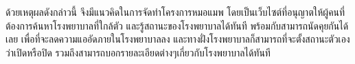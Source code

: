 \documentclass[12pt,a4paper]{report}
\begin{document}
ด้วยเหตุผลดังกล่าวนี้ จึงมีแนวคิดในการจัดทำโครงการหมอแมพ โดยเป็นเว็บไซต์ที่อนุญาตให้ผู้คนที่ต้องการค้นหาโรงพยาบาลที่ใกล้ตัว และรู้สถานะของโรงพยาบาลได้ทันที พร้อมกับสามารถนัดคุยกันได้เลย เพื่อที่จะลดความแออัดภายในโรงพยาบาลลง
และทางฝั่งโรงพยาบาลก็สามารถที่จะตั้งสถานะตัวเอง ว่าเปิดหรือปิด รวมถึงสามารถบอกรายละเอียดต่างๆเกี่ยวกับโรงพยาบาลได้ทันที



\nocite{*}


\end{document}
